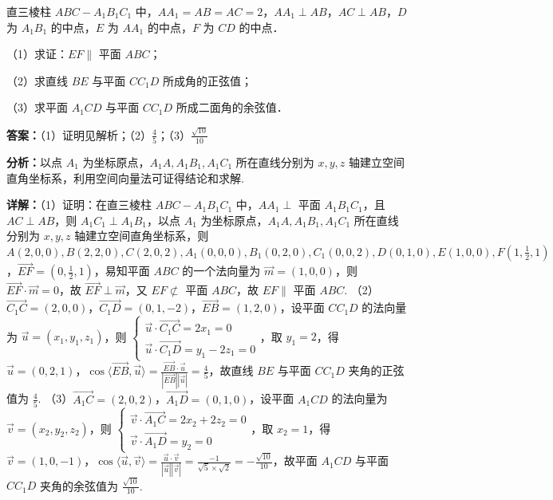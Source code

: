\begin{question}[points=15]
直三棱柱 $ABC-A_1B_1C_1$ 中，$AA_1=AB=AC=2$，$AA_1\perp AB$，$AC\perp AB$，$D$ 为 $A_1B_1$ 的中点，$E$ 为 $AA_1$ 的中点，$F$ 为 $CD$ 的中点．

（1）求证：$EF\parallel$ 平面 $ABC$；

（2）求直线 $BE$ 与平面 $CC_1D$ 所成角的正弦值；

（3）求平面 $A_1CD$ 与平面 $CC_1D$ 所成二面角的余弦值．
\begin{solution}
\textbf{答案：}（1）证明见解析；（2）$\frac{4}{5}$；（3）$\frac{\sqrt{10}}{10}$

\textbf{分析：}以点 $A_1$ 为坐标原点，$A_1A,A_1B_1,A_1C_1$ 所在直线分别为 $x,y,z$ 轴建立空间直角坐标系，利用空间向量法可证得结论和求解.

\textbf{详解：}（1）证明：在直三棱柱 $ABC-A_1B_1C_1$ 中，$AA_1\perp$ 平面 $A_1B_1C_1$，且 $AC\perp AB$，则 $A_1C_1\perp A_1B_1$，以点 $A_1$ 为坐标原点，$A_1A,A_1B_1,A_1C_1$ 所在直线分别为 $x,y,z$ 轴建立空间直角坐标系，则 $A(2,0,0),B(2,2,0),C(2,0,2),A_1(0,0,0),B_1(0,2,0),C_1(0,0,2),D(0,1,0),E(1,0,0),F(1,\frac{1}{2},1)$，$\overrightarrow{EF}=(0,\frac{1}{2},1)$，易知平面 $ABC$ 的一个法向量为 $\vec{m}=(1,0,0)$，则 $\overrightarrow{EF}\cdot\vec{m}=0$，故 $\overrightarrow{EF}\perp\vec{m}$，又 $EF\not\subset$ 平面 $ABC$，故 $EF\parallel$ 平面 $ABC$.
（2）$\overrightarrow{C_1C}=(2,0,0)$，$\overrightarrow{C_1D}=(0,1,-2)$，$\overrightarrow{EB}=(1,2,0)$，设平面 $CC_1D$ 的法向量为 $\vec{u}=(x_1,y_1,z_1)$，则 $\begin{cases} \vec{u}\cdot\overrightarrow{C_1C}=2x_1=0 \\ \vec{u}\cdot\overrightarrow{C_1D}=y_1-2z_1=0 \end{cases}$，取 $y_1=2$，得 $\vec{u}=(0,2,1)$，$\cos\langle\overrightarrow{EB},\vec{u}\rangle=\frac{\overrightarrow{EB}\cdot\vec{u}}{|\overrightarrow{EB}||\vec{u}|}=\frac{4}{5}$，故直线 $BE$ 与平面 $CC_1D$ 夹角的正弦值为 $\frac{4}{5}$.
（3）$\overrightarrow{A_1C}=(2,0,2)$，$\overrightarrow{A_1D}=(0,1,0)$，设平面 $A_1CD$ 的法向量为 $\vec{v}=(x_2,y_2,z_2)$，则 $\begin{cases} \vec{v}\cdot\overrightarrow{A_1C}=2x_2+2z_2=0 \\ \vec{v}\cdot\overrightarrow{A_1D}=y_2=0 \end{cases}$，取 $x_2=1$，得 $\vec{v}=(1,0,-1)$，$\cos\langle\vec{u},\vec{v}\rangle=\frac{\vec{u}\cdot\vec{v}}{|\vec{u}||\vec{v}|}=\frac{-1}{\sqrt{5}\times\sqrt{2}}=-\frac{\sqrt{10}}{10}$，故平面 $A_1CD$ 与平面 $CC_1D$ 夹角的余弦值为 $\frac{\sqrt{10}}{10}$.
\end{solution}
\end{question}

